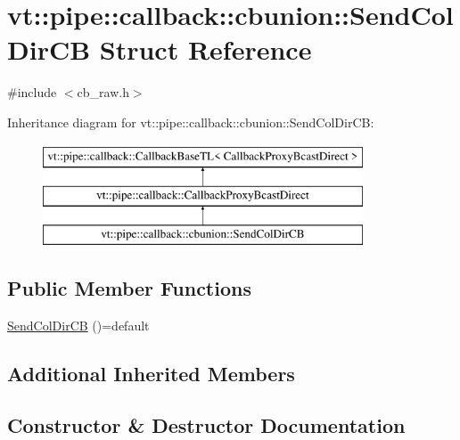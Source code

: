 \hypertarget{structvt_1_1pipe_1_1callback_1_1cbunion_1_1_send_col_dir_c_b}{}\section{vt\+:\+:pipe\+:\+:callback\+:\+:cbunion\+:\+:Send\+Col\+Dir\+CB Struct Reference}
\label{structvt_1_1pipe_1_1callback_1_1cbunion_1_1_send_col_dir_c_b}


{\ttfamily \#include $<$cb\+\_\+raw.\+h$>$}

Inheritance diagram for vt\+:\+:pipe\+:\+:callback\+:\+:cbunion\+:\+:Send\+Col\+Dir\+CB\+:\begin{figure}[H]
\begin{center}
\leavevmode
\includegraphics[height=3.000000cm]{structvt_1_1pipe_1_1callback_1_1cbunion_1_1_send_col_dir_c_b}
\end{center}
\end{figure}
\subsection*{Public Member Functions}
\begin{DoxyCompactItemize}
\item 
\hyperlink{structvt_1_1pipe_1_1callback_1_1cbunion_1_1_send_col_dir_c_b_afaba97522eab86eef75f726b76edafca}{Send\+Col\+Dir\+CB} ()=default
\end{DoxyCompactItemize}
\subsection*{Additional Inherited Members}


\subsection{Constructor \& Destructor Documentation}
\mbox{\label{structvt_1_1pipe_1_1callback_1_1cbunion_1_1_send_col_dir_c_b_afaba97522eab86eef75f726b76edafca}} 
